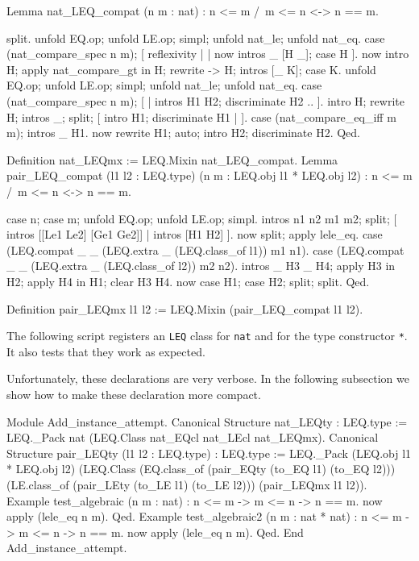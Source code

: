 \begin{coq_example}
Lemma nat_LEQ_compat (n m : nat) : n <= m /\ m <= n <-> n == m.
\end{coq_example}
\begin{coq_eval}

split.
  unfold EQ.op; unfold LE.op; simpl; unfold nat_le; unfold nat_eq.
  case (nat_compare_spec n m); [ reflexivity | | now intros _ [H _]; case H ].
  now intro H; apply nat_compare_gt in H; rewrite -> H; intros [_ K]; case K.
unfold EQ.op; unfold LE.op; simpl; unfold nat_le; unfold nat_eq.
case (nat_compare_spec n m); [ | intros H1 H2; discriminate H2 .. ].
intro H; rewrite H; intros _; split; [ intro H1; discriminate H1 | ].
case (nat_compare_eq_iff m m); intros _ H1.
now rewrite H1; auto; intro H2; discriminate H2.
Qed.
\end{coq_eval}
\begin{coq_example}
Definition nat_LEQmx := LEQ.Mixin nat_LEQ_compat.
Lemma pair_LEQ_compat (l1 l2 : LEQ.type) (n m : LEQ.obj l1 * LEQ.obj l2) :
n <= m /\ m <= n <-> n == m.
\end{coq_example}
\begin{coq_eval}

case n; case m; unfold EQ.op; unfold LE.op; simpl.
intros n1 n2 m1 m2; split; [ intros [[Le1 Le2] [Ge1 Ge2]] | intros [H1 H2] ].
  now split; apply lele_eq.
case (LEQ.compat _ _ (LEQ.extra _ (LEQ.class_of l1)) m1 n1).
case (LEQ.compat _ _ (LEQ.extra _ (LEQ.class_of l2)) m2 n2).
intros _ H3 _ H4; apply H3 in H2; apply H4 in H1; clear H3 H4.
now case H1; case H2; split; split.
Qed.
\end{coq_eval}
\begin{coq_example}
Definition pair_LEQmx l1 l2 := LEQ.Mixin (pair_LEQ_compat l1 l2).
\end{coq_example}

The following script registers an \texttt{LEQ} class for \texttt{nat} and for the
type constructor \texttt{*}.  It also tests that they work as expected.

Unfortunately, these declarations are very verbose.  In the following
subsection we show how to make these declaration more compact.

\begin{coq_example}
Module Add_instance_attempt.
  Canonical Structure nat_LEQty : LEQ.type :=
    LEQ._Pack nat (LEQ.Class nat_EQcl nat_LEcl nat_LEQmx).
  Canonical Structure pair_LEQty (l1 l2 : LEQ.type) : LEQ.type :=
    LEQ._Pack (LEQ.obj l1 * LEQ.obj l2)
      (LEQ.Class
        (EQ.class_of (pair_EQty (to_EQ l1) (to_EQ l2)))
        (LE.class_of (pair_LEty (to_LE l1) (to_LE l2)))
        (pair_LEQmx l1 l2)).
  Example test_algebraic (n m : nat) : n <= m -> m <= n -> n == m.
   now apply (lele_eq n m). Qed.
  Example test_algebraic2 (n m : nat * nat) : n <= m -> m <= n -> n == m.
   now apply (lele_eq n m). Qed.
End Add_instance_attempt.
\end{coq_example}

